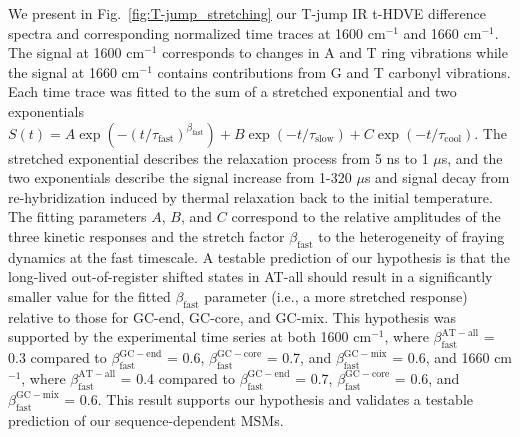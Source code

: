 \documentclass[journal=jpcbfk,manuscript=article]{achemso}
\begin{document}
We present in Fig.~\ref{fig:T-jump_stretching} our T-jump IR t-HDVE difference spectra and corresponding normalized time traces at 1600 cm$^{-1}$ and 1660 cm$^{-1}$. The signal at 1600 cm$^{-1}$ corresponds to changes in A and T ring vibrations while the signal at 1660 cm$^{-1}$ contains contributions from G and T carbonyl vibrations. Each time trace was fitted to the sum of a stretched exponential and two exponentials $S(t) = A\exp{(-(t/\tau_{\mathrm{fast}})^{\beta_\mathrm{fast}})} + B\exp{(-t/\tau_{\mathrm{slow}})}+C\exp{(-t/\tau_{\mathrm{cool}})}$. The stretched exponential describes the relaxation process from 5 ns to 1 $\mu$s, and the two exponentials describe the signal increase from 1-320 $\mu$s and signal decay from re-hybridization induced by thermal relaxation back to the initial temperature. The fitting parameters $A$, $B$, and $C$ correspond to the relative amplitudes of the three kinetic responses and the stretch factor $\beta_\mathrm{fast}$ to the heterogeneity of fraying dynamics at the fast timescale. A testable prediction of our hypothesis is that the long-lived out-of-register shifted states in AT-all should result in a significantly smaller value for the fitted $\beta_\mathrm{fast}$ parameter (i.e., a more stretched response) relative to those for GC-end, GC-core, and GC-mix. This hypothesis was supported by the experimental time series at both 1600 cm$^{-1}$, where $\beta_\mathrm{fast}^\mathrm{AT-all}$ = 0.3 compared to $\beta_\mathrm{fast}^\mathrm{GC-end}$ = 0.6, $\beta_\mathrm{fast}^\mathrm{GC-core}$ = 0.7, and $\beta_\mathrm{fast}^\mathrm{GC-mix}$ = 0.6, and 1660 cm$^{-1}$, where $\beta_\mathrm{fast}^\mathrm{AT-all}$ = 0.4 compared to $\beta_\mathrm{fast}^\mathrm{GC-end}$ = 0.7, $\beta_\mathrm{fast}^\mathrm{GC-core}$ = 0.6, and $\beta_\mathrm{fast}^\mathrm{GC-mix}$ = 0.6. This result supports our hypothesis and validates a testable prediction of our sequence-dependent MSMs.  
\end{document}
